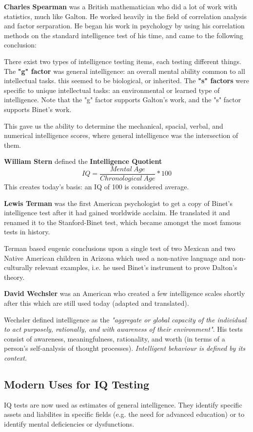 \documentclass[12pt]{article}
\begin{document}
{\bf Charles Spearman} was a British mathematician who did a lot of work with statistics, much like Galton. He worked heavily in the field of correlation analysis and factor serparation. He began his work in psychology by using his correlation methods on the standard intelligence test of his time, and came to the following conclusion:

There exist two types of intelligence testing items, each testing different things. The {\bf "g" factor} was general intelligence: an overall mental ability common to all intellectual tasks. this seemed to be biological, or inherited. The {\bf "s" factors} were specific to unique intellectual tasks: an environmental or learned type of intelligence. Note that the "g" factor supports Galton's work, and the "s" factor supports Binet's work.

This gave us the ability to determine the mechanical, spacial, verbal, and numerical intelligence scores, where general intelligence was the intersection of them.

{\bf William Stern} defined the {\bf Intelligence Quotient} \[ IQ = \frac{Mental\ Age}{Chronological\ Age} * 100 \] This creates today's basis: an IQ of 100 is considered average.

{\bf Lewis Terman} was the first American psychologist to get a copy of Binet's intelligence test after it had gained worldwide acclaim. He translated it and renamed it to the Stanford-Binet test, which became amongst the most famous tests in history.

Terman based eugenic conclusions upon a single test of two Mexican and two Native American children in Arizona which used a non-native language and non-culturally relevant examples, i.e. he used Binet's instrument to prove Dalton's theory.

{\bf David Wechsler} was an American who created a few intelligence scales shortly after this which are still used today (adapted and translated).

Wechsler defined intelligence as the {\it "aggregate or global capacity of the individual to act purposely, rationally, and with awareness of their environment"}. His tests consist of awareness, meaningfulness, rationality, and worth (in terms of a person's self-analysis of thought processes). {\it Intelligent behaviour is defined by its context}.

\subsection*{Modern Uses for IQ Testing}
IQ tests are now used as estimates of general intelligence. They identify specific assets and liabilites in specific fields (e.g. the need for advanced education) or to identify mental deficiencies or dysfunctions.
\end{document}
